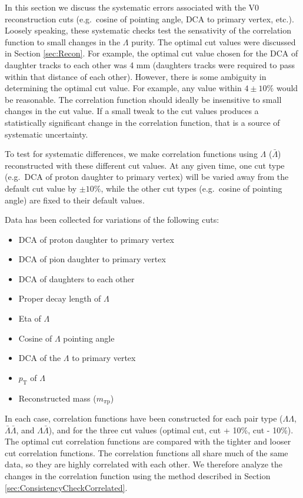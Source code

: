 In this section we discuss the systematic errors associated with the V0 reconstruction cuts (e.g.\ cosine of pointing angle, DCA to primary vertex, etc.).  
Loosely speaking, these systematic checks test the sensativity of the correlation function to small changes in the $\Lambda$ purity.
The optimal cut values were discussed in Section \ref{sec:Recon}.  
For example, the optimal cut value chosen for the DCA of daughter tracks to each other was 4 mm (daughters tracks were required to pass within that distance of each other).    
However, there is some ambiguity in determining the optimal cut value.  
For example, any value within $4\pm10\%$ would be reasonable.
The correlation function should ideally be insensitive to small changes in the cut value.
If a small tweak to the cut values produces a statistically significant change in the correlation function, that is a source of systematic uncertainty.

To test for systematic differences, we make correlation functions using $\Lambda$ ($\bar{\Lambda}$) reconstructed with these different cut values. 
At any given time, one cut type (e.g.\ DCA of proton daughter to primary vertex) will be varied away from the default cut value by $\pm10\%$, while the other cut types (e.g.\ cosine of pointing angle) are fixed to their default values. 
  
Data has been collected for variations of the following cuts: 
\begin{itemize}
\item DCA of proton daughter to primary vertex
\item DCA of pion daughter to primary vertex
\item DCA of daughters to each other
\item Proper decay length of $\Lambda$
\item Eta of $\Lambda$
\item Cosine of $\Lambda$ pointing angle
\item DCA of the $\Lambda$ to primary vertex
\item $p_{\mathrm{T}}$ of $\Lambda$
\item Reconstructed mass ($m_{\pi\mathrm{p}}$)
\end{itemize}
  
In each case, correlation functions have been constructed for each pair type ($\Lambda\Lambda$, $\bar{\Lambda}\bar{\Lambda}$, and $\Lambda\bar{\Lambda}$), and for the three cut values (optimal cut, cut + 10\%, cut - 10\%).  
The optimal cut correlation functions are compared with the tighter and looser cut correlation functions.  
The correlation functions all share much of the same data, so they are highly correlated with each other.  
We therefore analyze the changes in the correlation function using the method described in Section \ref{sec:ConsistencyCheckCorrelated}.

